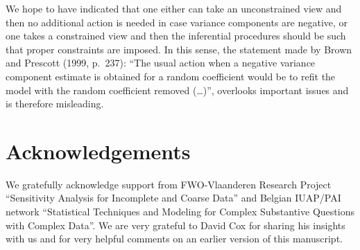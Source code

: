 \documentclass[useAMS,usenatbib,referee]{biom}
\begin{document}
We hope to have indicated that one either can take an unconstrained
view and then no additional action is needed in case variance
components are negative, or one takes a constrained view and then the
inferential procedures should be such that proper constraints are
imposed.  In this sense, the statement made by Brown and Prescott
(1999, p.~237): ``The usual action when a negative variance component
estimate is obtained for a random coefficient would be to refit the
model with the random coefficient removed (\dots)'', overlooks
important issues and is therefore misleading.

\backmatter


\section*{Acknowledgements}
We gratefully acknowledge support from FWO-Vlaanderen Research Project
``Sensitivity Analysis for Incomplete and Coarse Data'' and Belgian
IUAP/PAI network ``Statistical Techniques and Modeling for Complex
Substantive Questions with Complex Data''. We are very grateful to
David Cox for sharing his insights with us and for very helpful
comments on an earlier version of this manuscript.




\end{document}
